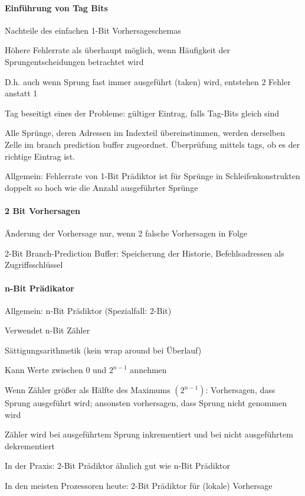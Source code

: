 \documentclass[10pt,landscape]{article}
\begin{document}
\begin{multicols}{3}
  \paragraph{ Einführung von Tag Bits}
  \begin{itemize*}
    \item Nachteile des einfachen 1-Bit Vorhersageschemas
    \item Höhere Fehlerrate als überhaupt möglich, wenn Häufigkeit der Sprungentscheidungen betrachtet wird
    \item D.h. auch wenn Sprung fast immer ausgeführt (taken) wird, entstehen 2 Fehler anstatt 1
    \item Tag beseitigt eines der Probleme: gültiger Eintrag, falls Tag-Bits gleich sind
    \item Alle Sprünge, deren Adressen im Indexteil übereinstimmen, werden derselben Zelle im branch prediction buffer zugeordnet. Überprüfung mittels tags, ob es der richtige Eintrag ist.
    \item Allgemein: Fehlerrate von 1-Bit Prädiktor ist für Sprünge in Schleifenkonstrukten doppelt so hoch wie die Anzahl ausgeführter Sprünge
  \end{itemize*}
  
  \paragraph{ 2 Bit Vorhersagen}
  \begin{itemize*}
    \item Änderung der Vorhersage nur, wenn 2 falsche Vorhersagen in Folge
    \item 2-Bit Branch-Prediction Buffer: Speicherung der Historie, Befehlsadressen als Zugriffsschlüssel
  \end{itemize*}
  
  
  \paragraph{ n-Bit Prädikator}
  Allgemein: n-Bit Prädiktor (Spezialfall: 2-Bit)
  \begin{itemize*}
    \item Verwendet n-Bit Zähler
    \item Sättigungsarithmetik (kein wrap around bei Überlauf)
    \item Kann Werte zwischen 0 und $2^{n-1}$ annehmen
    \item Wenn Zähler größer als Hälfte des Maximums $(2^{n-1})$: Vorhersagen, dass Sprung ausgeführt wird; ansonsten vorhersagen, dass Sprung nicht genommen wird
    \item Zähler wird bei ausgeführtem Sprung inkrementiert und bei nicht ausgeführtem dekrementiert
    \item In der Praxis: 2-Bit Prädiktor ähnlich gut wie n-Bit Prädiktor
    \item In den meisten Prozessoren heute: 2-Bit Prädiktor für (lokale) Vorhersage
  \end{itemize*}
  

\end{multicols}
\end{document}
